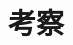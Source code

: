 \documentclass[../main.tex]{subfiles}
\begin{document}
\section{考察}
\label{sec:discussion}
\end{document}
